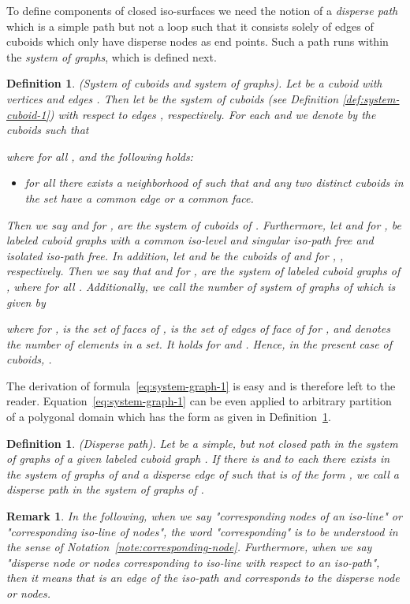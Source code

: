\documentclass[a4paper,11pt]{article}
\newtheorem{definition}[theorem]{Definition}
\newtheorem{remark}[theorem]{Remark}
\begin{document}
To define components of closed iso-surfaces we need the notion of a {\it disperse path} which is a simple
path but not a loop such that it consists solely of edges of cuboids which only have disperse nodes as
end points. Such a path runs within the {\it system of graphs}, which is defined next.

\begin{definition}(System of cuboids and system of graphs).  Let  be a cuboid with vertices
 and edges . Then let 
be the system of cuboids (see Definition \ref{def:system-cuboid-1}) with respect to edges
, respectively. For each  and  we denote by
 the cuboids such that

where  for all , and the following holds:
\begin{itemize}
\item for all  there exists a neighborhood  of 
      such that  and any two distinct cuboids
      in the set  have a common edge
      or a common face.
\end{itemize}
Then we say  and  for ,  are the system of cuboids
of . Furthermore, let  and  for ,  be labeled cuboid graphs with a common
iso-level  and singular iso-path free and isolated iso-path free. In addition, let
 and  be the cuboids of  and  for , ,
respectively. Then we say that  and  for ,  are the
system of labeled cuboid graphs of , where  for all .
Additionally, we call  the number of system of graphs of  which is given by

where  for ,  is the set of faces of
,  is the set of edges of face  of  for , and  denotes
the number of elements in a set. It holds  for  and . Hence,
in the present case of cuboids, .
\label{def:curve-1}
\end{definition}
The derivation of formula~\eqref{eq:system-graph-1} is easy and is therefore left to the reader.
Equation~\eqref{eq:system-graph-1} can be even applied to arbitrary partition
of a polygonal domain which has the form as given in Definition~\ref{def:curve-1}.


\begin{definition}(Disperse path). Let  be a simple, but not closed path in the system of graphs
of a given labeled cuboid graph . If there is  and to each 
there exists  in the system of graphs of  and a disperse edge 
of  such that  is of the form , we call  a disperse path in
the system of graphs of .
\label{def:disperse-path}
\end{definition}

\begin{remark}
In the following, when we say "corresponding nodes of an iso-line" or
"corresponding iso-line of nodes", the word "corresponding" is to be understood in the
sense of Notation~\ref{note:corresponding-node}. Furthermore, when we say "disperse
node or nodes corresponding to iso-line  with respect to an iso-path", then it means that
 is an edge of the iso-path and  corresponds to the disperse node or nodes.
\label{rem:corresponding-node-line}
\end{remark}
\end{document}
